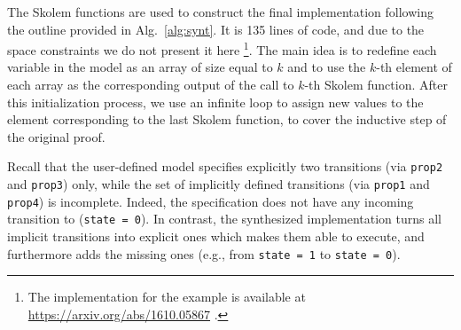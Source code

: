 The Skolem functions are used to construct the final implementation
following the outline provided in Alg.~\ref{alg:synt}. 
It is 135 lines of code, and due to the space constraints we do not
present it here%
\footnote{The implementation for the
example is available at \url{https://arxiv.org/abs/1610.05867} .}.
The main idea is to redefine each variable in the model 
as an array of size equal to $k$ and
to use the $k$-th element of each array as the corresponding output of the call
to $k$-th Skolem function. After this initialization process, we use an infinite
loop to assign new values to the element corresponding to the last Skolem
function, to cover the inductive step of the original proof.

Recall that the user-defined model specifies explicitly two transitions (via \texttt{prop2} and \texttt{prop3}) only, while the set of implicitly defined transitions (via \texttt{prop1} and \texttt{prop4}) is incomplete.
Indeed, the specification does not have any incoming transition to (\texttt{state = 0}).
In contrast, the synthesized implementation turns all implicit transitions into explicit ones which makes them able to execute, and furthermore adds the missing ones (e.g., from \texttt{state = 1} to \texttt{state = 0}).



